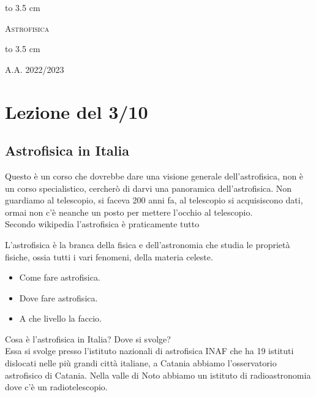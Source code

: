 \documentclass[a4paper,11pt]{article}
\begin{document}
\begin{titlepage}
  \begin{midpage}
       \begin{center}
      
      \vspace{2 cm}    
      \centerline{\hbox to 3.5 cm {\hrulefill}}
      \medskip
      \medskip
      \textsc{ \Huge Astrofisica}
      \centerline{\hbox to 3.5 cm {\hrulefill}}
      \vspace{3 cm}
     
      
      \vspace{8.9 cm}
      \textsc{A.A. 2022/2023}
      
        \end{center}
 \end{midpage}
\end{titlepage}

\newpage
{}
\tableofcontents
\newpage
{}


\section{Lezione del 3/10}
\subsection{Astrofisica in Italia}
Questo è un corso che dovrebbe dare una visione generale dell'astrofisica, non è un corso specialistico, cercherò di darvi una panoramica dell'astrofisica. Non guardiamo al telescopio, si faceva 200 anni fa, al telescopio si acquisiscono dati, ormai non c'è neanche un posto per mettere l'occhio al telescopio.\\
Secondo wikipedia l'astrofisica è praticamente tutto
\begin{center}
   L'astrofisica è la branca della fisica e dell'astronomia che studia le proprietà fisiche, ossia tutti i vari fenomeni, della materia celeste. 
\end{center}
\begin{itemize}
    \item Come fare astrofisica.
    \item Dove fare astrofisica.
    \item A che livello la faccio.
\end{itemize}
Cosa è l'astrofisica in Italia? Dove si svolge?\\
Essa si svolge presso l'istituto nazionali di astrofisica INAF che ha 19 istituti dislocati nelle più grandi città italiane, a Catania abbiamo l'osservatorio astrofisico di Catania. Nella valle di Noto abbiamo un istituto di radioastronomia dove c'è un radiotelescopio. 
\end{document}
